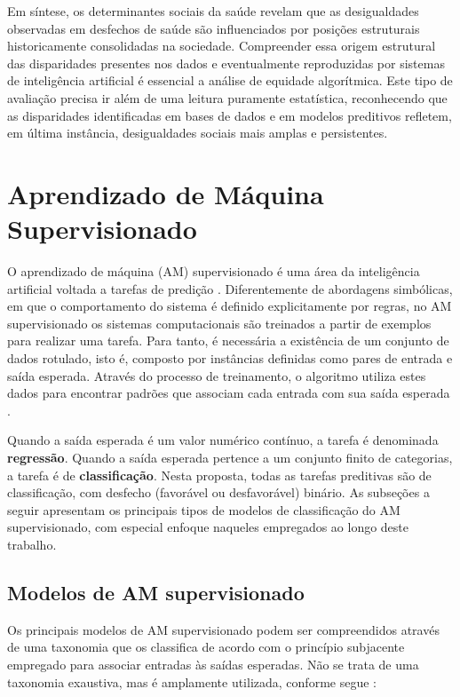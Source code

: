 Em síntese, os determinantes sociais da saúde revelam que as desigualdades observadas em desfechos de saúde são influenciados por posições estruturais historicamente consolidadas na sociedade.  Compreender essa origem estrutural das disparidades presentes nos dados e eventualmente reproduzidas por sistemas de inteligência artificial é essencial a análise de equidade algorítmica. Este tipo de avaliação precisa ir além de uma leitura puramente estatística, reconhecendo que as disparidades identificadas em bases de dados e em modelos preditivos refletem, em última instância, desigualdades sociais mais amplas e persistentes.

\section{Aprendizado de Máquina Supervisionado}

O aprendizado de máquina (AM) supervisionado é uma área da inteligência artificial voltada a tarefas de predição \cite{faceli2021inteligencia}. Diferentemente de abordagens simbólicas, em que o comportamento do sistema é definido explicitamente por regras, no AM supervisionado os sistemas computacionais são treinados a partir de exemplos para realizar uma tarefa. Para tanto, é necessária a existência de um conjunto de dados rotulado, isto é, composto por instâncias definidas como pares de entrada e saída esperada. Através do processo de treinamento, o algoritmo utiliza estes dados para encontrar padrões que associam cada entrada com sua saída esperada \cite{bazzan2023nova}.

Quando a saída esperada é um valor numérico contínuo, a tarefa é denominada \textbf{regressão}. Quando a saída esperada pertence a um conjunto finito de categorias, a tarefa é de \textbf{classificação}. Nesta proposta, todas as tarefas preditivas são de classificação, com desfecho (favorável ou desfavorável) binário. As subseções a seguir apresentam os principais tipos de modelos de classificação do AM supervisionado, com especial enfoque naqueles empregados ao longo deste trabalho.

\subsection{Modelos de AM supervisionado}
Os principais modelos de AM supervisionado podem ser compreendidos através de uma taxonomia que os classifica de acordo com o princípio subjacente empregado para associar entradas às saídas esperadas. Não se trata de uma taxonomia exaustiva, mas é amplamente utilizada, conforme segue \cite{bazzan2023nova}:

